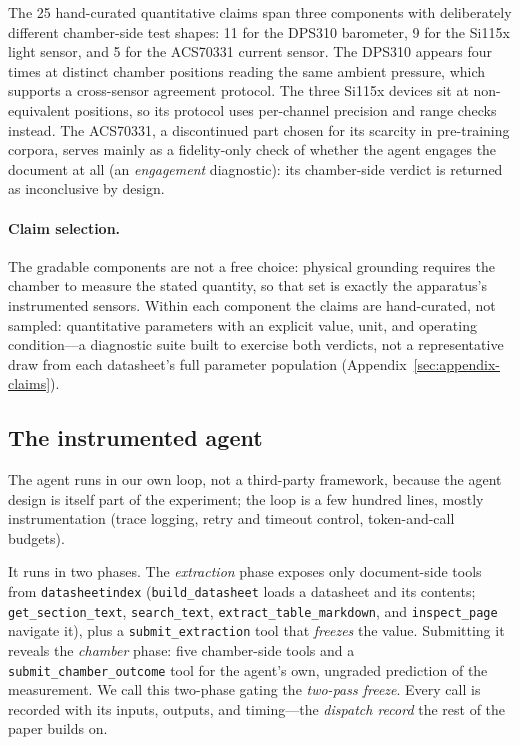 \documentclass[11pt]{article}
\begin{document}
The 25 hand-curated quantitative claims span three components with
deliberately different chamber-side test shapes: 11 for the DPS310
barometer, 9 for the Si115x light sensor, and 5 for the ACS70331
current sensor. The DPS310 appears four times at distinct chamber
positions reading the same ambient pressure, which supports a
cross-sensor agreement protocol. The three Si115x devices sit at
non-equivalent positions, so its protocol uses per-channel precision
and range checks instead. The ACS70331, a discontinued part chosen
for its scarcity in pre-training corpora, serves mainly as a
fidelity-only check of whether the agent engages the document at all
(an \emph{engagement} diagnostic): its chamber-side verdict is returned
as inconclusive by design.

\paragraph{Claim selection.}
The gradable components are not a free choice: physical grounding
requires the chamber to measure the stated quantity, so that set is
exactly the apparatus's instrumented sensors. Within each component the
claims are hand-curated, not sampled: quantitative parameters with an
explicit value, unit, and operating condition---a diagnostic suite built
to exercise both verdicts, not a representative draw from each
datasheet's full parameter population
(Appendix~\ref{sec:appendix-claims}).

\subsection{The instrumented agent}
\label{sec:design-agent}

The agent runs in our own loop, not a third-party framework, because
the agent design is itself part of the experiment; the loop is a few
hundred lines, mostly instrumentation (trace logging, retry and timeout
control, token-and-call budgets).

It runs in two phases. The \emph{extraction} phase exposes only
document-side tools from \texttt{datasheetindex}
(\texttt{build\_datasheet} loads a datasheet and its contents;
\texttt{get\_section\_text}, \texttt{search\_text},
\texttt{extract\_table\_markdown}, and \texttt{inspect\_page} navigate
it), plus a \texttt{submit\_extraction} tool that \emph{freezes} the
value. Submitting it reveals the \emph{chamber} phase: five
chamber-side tools and a \texttt{submit\_chamber\_outcome} tool for
the agent's own, ungraded prediction of the measurement. We call this two-phase gating the
\emph{two-pass freeze}. Every call is recorded with its inputs, outputs,
and timing---the \emph{dispatch record} the rest of the paper builds on.
\end{document}
